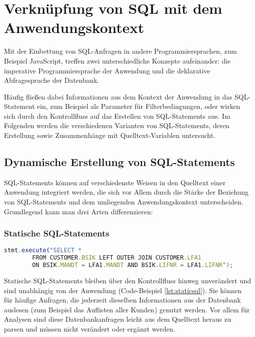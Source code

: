 \section{Verkn{\"u}pfung von SQL mit dem Anwendungskontext}\label{sec:dependencydetection}

%
%

Mit der Einbettung von SQL-Anfragen in andere Programmiersprachen, zum Beispiel JavaScript, treffen zwei unterschiedliche Konzepte aufeinander: die imperative Programmiersprache der Anwendung und die deklarative Abfragesprache der Datenbank.

Häufig fließen dabei Informationen aus dem Kontext der Anwendung in das SQL-Statement ein, zum Beispiel als Parameter für Filterbedingungen, oder wirken sich durch den Kontrollfluss auf das Erstellen von SQL-Statements aus.
Im Folgenden werden die verschiedenen Varianten von SQL-Statements, deren Erstellung sowie Zusammenhänge mit Quelltext-Variablen untersucht.

\subsection{Dynamische Erstellung von SQL-Statements}
SQL-Statements können auf verschiedenste Weisen in den Quelltext einer Anwendung integriert werden, die sich vor Allem durch die Stärke der Beziehung von SQL-Statements und dem umliegenden Anwendungskontext unterscheiden.
Grundlegend kann man drei Arten differenzieren:

\subsubsection{Statische SQL-Statements}

	\begin{lstlisting}[caption={Statisches Statement eingebettet im Quelltext}, label={lst:staticsql}, language=JavaScript]
		stmt.execute("SELECT *
		FROM CUSTOMER.BSIK LEFT OUTER JOIN CUSTOMER.LFA1
		ON BSIK.MANDT = LFA1.MANDT AND BSIK.LIFNR = LFA1.LIFNR");
	\end{lstlisting}

Statische SQL-Statements bleiben über den Kontrollfluss hinweg unverändert und sind unabhängig von der Anwendung (Code-Beispiel \ref{lst:staticsql}).
Sie können für häufige Anfragen, die jederzeit dieselben Informationen aus der Datenbank auslesen (zum Beispiel das Auflisten aller Kunden) genutzt werden.
Vor allem für Analysen sind diese Datenbankanfragen leicht aus dem Quelltext heraus zu parsen und müssen nicht verändert oder ergänzt werden.

